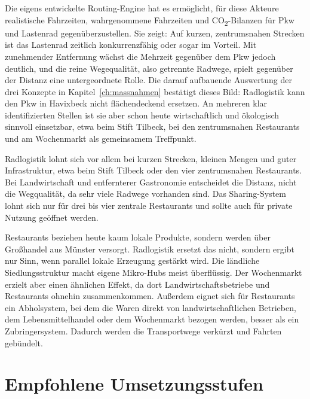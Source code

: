 \documentclass[a4paper,11pt,parskip=half,numbers=noenddot]{scrreprt}
\begin{document}
Die eigens entwickelte Routing-Engine hat es ermöglicht, für diese Akteure realistische Fahrzeiten, wahrgenommene Fahrzeiten und CO\textsubscript{2}-Bilanzen für Pkw und Lastenrad gegenüberzustellen. Sie zeigt: Auf kurzen, zentrumsnahen Strecken ist das Lastenrad zeitlich konkurrenzfähig oder sogar im Vorteil. Mit zunehmender Entfernung wächst die Mehrzeit gegenüber dem Pkw jedoch deutlich, und die reine Wegequalität, also getrennte Radwege, spielt gegenüber der Distanz eine untergeordnete Rolle. Die darauf aufbauende Auswertung der drei Konzepte in Kapitel~\ref{ch:massnahmen} bestätigt dieses Bild: Radlogistik kann den Pkw in Havixbeck nicht flächendeckend ersetzen. An mehreren klar identifizierten Stellen ist sie aber schon heute wirtschaftlich und ökologisch sinnvoll einsetzbar, etwa beim Stift Tilbeck, bei den zentrumsnahen Restaurants und am Wochenmarkt als gemeinsamem Treffpunkt.

Radlogistik lohnt sich vor allem bei kurzen Strecken, kleinen Mengen und guter Infrastruktur, etwa beim Stift Tilbeck oder den vier zentrumsnahen Restaurants. Bei Landwirtschaft und entfernterer Gastronomie entscheidet die Distanz, nicht die Wegqualität, da sehr viele Radwege vorhanden sind. Das Sharing-System lohnt sich nur für drei bis vier zentrale Restaurants und sollte auch für private Nutzung geöffnet werden.

Restaurants beziehen heute kaum lokale Produkte, sondern werden über Großhandel aus Münster versorgt. Radlogistik ersetzt das nicht, sondern ergibt nur Sinn, wenn parallel lokale Erzeugung gestärkt wird. Die ländliche Siedlungsstruktur macht eigene Mikro-Hubs meist überflüssig. Der Wochenmarkt erzielt aber einen ähnlichen Effekt, da dort Landwirtschaftsbetriebe und Restaurants ohnehin zusammenkommen. Außerdem eignet sich für Restaurants ein Abholsystem, bei dem die Waren direkt von landwirtschaftlichen Betrieben, dem Lebensmittelhandel oder dem Wochenmarkt bezogen werden, besser als ein Zubringersystem. Dadurch werden die Transportwege verkürzt und Fahrten gebündelt.

\section{Empfohlene Umsetzungsstufen}
\end{document}
